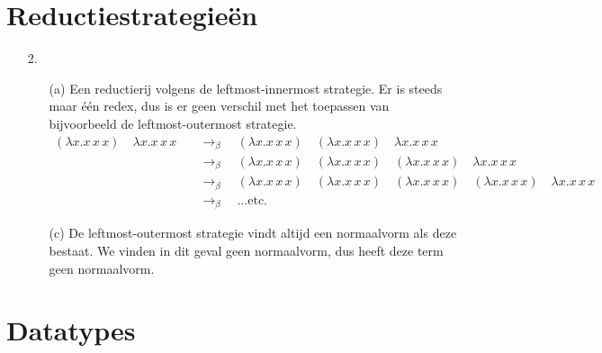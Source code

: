\documentclass[a4paper,11pt]{article}
\begin{document}
\section{Reductiestrategie\"en}


\begin{enumerate}


\item[2.]

\begin{enumerate}
\item[(a)]
Een reductierij volgens de leftmost-innermost strategie. Er is steeds maar \'e\'en redex,
dus is er geen verschil met het toepassen van bijvoorbeeld de leftmost-outermost strategie.
\begin{align*}
  (\lambda x. x \, x \, x) \quad \lambda x. x \, x \, x
  & \quad \rightarrow_{\beta} \quad
  (\lambda x. x \, x \, x) \quad (\lambda x. x \, x \, x) \quad \lambda x. x \, x \, x\\
  & \quad \rightarrow_{\beta} \quad
  (\lambda x. x \, x \, x) \quad (\lambda x. x \, x \, x) \quad (\lambda x. x \, x \, x) \quad \lambda x. x \, x \, x\\
  & \quad \rightarrow_{\beta} \quad
  (\lambda x. x \, x \, x) \quad (\lambda x. x \, x \, x) \quad (\lambda x. x \, x \, x) \quad (\lambda x. x \, x \, x) \quad \lambda x. x \, x \, x\\
  & \quad \rightarrow_{\beta} \quad
  \ldots \text{etc.}
\end{align*}

\item[(c)]
De leftmost-outermost strategie vindt altijd een normaalvorm als deze bestaat.
We vinden in dit geval geen normaalvorm, dus heeft deze term geen normaalvorm. 

\end{enumerate}


\end{enumerate}


\section{Datatypes}
\end{document}
